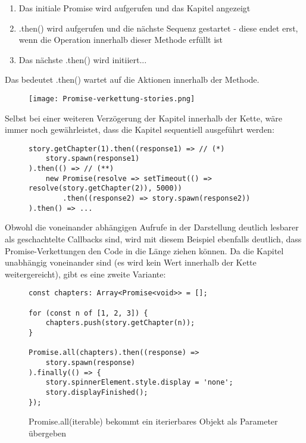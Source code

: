 \begin{enumerate}
    \item Das initiale Promise wird aufgerufen und das Kapitel angezeigt
    \item .then() wird aufgerufen und die nächste Sequenz gestartet -         diese endet erst, wenn die Operation innerhalb dieser Methode          erfüllt ist
    \item Das nächste .then() wird initiiert...
\end{enumerate}

Das bedeutet .then() wartet auf die Aktionen innerhalb der Methode.

\begin{figure}[H]
\centering
\texttt{[image: Promise-verkettung-stories.png]}
\end{figure}

\noindent
Selbst bei einer weiteren Verzögerung der Kapitel innerhalb der Kette, wäre immer noch gewährleistet, dass die Kapitel sequentiell ausgeführt werden:

\begin{figure}[H]
\begin{lstlisting}[basicstyle=\small]
story.getChapter(1).then((response1) => // (*)
    story.spawn(response1)
).then(() => // (**)
    new Promise(resolve => setTimeout(() => resolve(story.getChapter(2)), 5000))
        .then((response2) => story.spawn(response2))
).then() => ...
\end{lstlisting}
\end{figure}

\noindent
Obwohl die voneinander abhängigen Aufrufe in der Darstellung deutlich lesbarer als geschachtelte Callbacks sind, wird mit diesem Beispiel ebenfalls deutlich, dass Promise-Verkettungen den Code in die Länge ziehen können. Da die Kapitel unabhängig voneinander sind (es wird kein Wert innerhalb der Kette weitergereicht), gibt es eine zweite Variante: 

\begin{figure}[H]
\begin{lstlisting}[basicstyle=\small]
const chapters: Array<Promise<void>> = [];

for (const n of [1, 2, 3]) {
    chapters.push(story.getChapter(n));
}

Promise.all(chapters).then((response) =>
    story.spawn(response)
).finally(() => {
    story.spinnerElement.style.display = 'none';
    story.displayFinished();
});
\end{lstlisting}
\caption{Promise.all(iterable) bekommt ein iterierbares Objekt als Parameter übergeben}
\end{figure}

